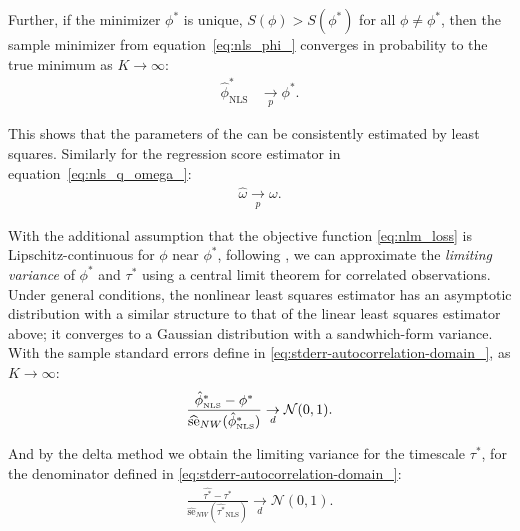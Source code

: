 \documentclass[docs/main.tex]{subfiles}
\begin{document}
\noindent Further, if the minimizer $\phi^*$ is unique, $S(\phi) > S(\phi^*)$ for all $\phi \ne \phi^*$, then the sample minimizer from equation~\eqref{eq:nls_phi_} converges in probability to the true minimum as $K\to\infty$:
\begin{align}
\hat \phi^*_{\scriptscriptstyle\text{NLS}} &\underset{p}{\to} \phi^*.
\end{align}

\noindent This shows that the parameters of the  can be consistently estimated by least squares. Similarly for the regression score estimator in equation~\eqref{eq:nls_q_omega_}:
\begin{align}
\hat \omega \underset{p}{\to} \omega.
\end{align}


With the additional assumption that the objective function \eqref{eq:nlm_loss} is Lipschitz-continuous for $\phi$ near $\phi^*$, following \citet[Theorem~23.2]{hansen_econometrics_2022}, we can approximate the \textit{limiting variance} of $\phi^*$ and $\tau^*$ using a central limit theorem for correlated observations. Under general conditions, the nonlinear least squares estimator has an asymptotic distribution with a similar structure to that of the linear least squares estimator above; it converges to a Gaussian distribution with a sandwhich-form variance. With the sample standard errors define in \eqref{eq:stderr-autocorrelation-domain_}, as $K\to\infty$:
\begin{align}
\frac{\hat\phi^*_{\scriptscriptstyle\scriptscriptstyle\text{NLS}} - \phi^*}{\widehat{\text{se}}_{NW}(\hat\phi^*_{\scriptscriptstyle\text{NLS}})} \underset{d}{\to} \mathcal{N}(0, 1). \label{eq:nls-phi-clt}
\end{align}

\noindent And by the delta method we obtain the limiting variance for the timescale $\tau^*$, for the denominator defined in \eqref{eq:stderr-autocorrelation-domain_}:
\begin{align}
\frac{\hat{\tau^*} - \tau^*}{\widehat{\text{se}}_{NW}(\hat{\tau^*}_{\scriptscriptstyle\text{NLS}})} \underset{d}{\to} \mathcal{N}(0,1).
\end{align}
\end{document}
